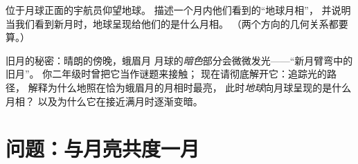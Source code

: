 \begin{exercise}[$\star\star$]\label{exo:g7:moon-phases:11}
位于月球正面的宇航员仰望地球。
描述一个月内他们看到的“地球月相”，
并说明当我们看到新月时，地球呈现给他们的是什么月相。
（两个方向的几何关系都要算。）
\end{exercise}

\begin{exercise}[$\star\star\star$]\label{exo:g7:moon-phases:12}
旧月的秘密：晴朗的傍晚，蛾眉月
月球的\emph{暗色}部分会微微发光——“新月臂弯中的旧月”。
你二年级时曾把它当作谜题来接触；
现在请彻底解开它：追踪光的路径，
解释为什么地照在恰为蛾眉月的月相时最亮，
此时\emph{地球}向月球呈现的是什么月相？
以及为什么它在接近满月时逐渐变暗。
\end{exercise}

\section{问题：与月亮共度一月}

